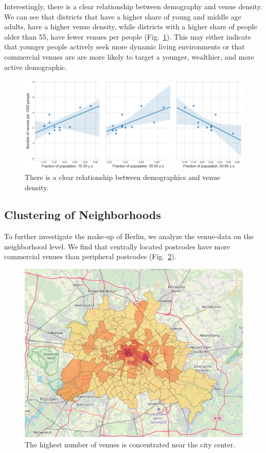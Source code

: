\documentclass[letter]{scrartcl}
\begin{document}
\clearpage 

Interestingly, there is a clear relationship between demography and venue density. We can see that districts that have a higher share of young and middle age adults, have a higher venue density, while  districts with a higher share of people older than 55, have fewer venues per people (Fig.~\ref{fig:PopVsVen}). This may either indicate that younger people actively seek more dynamic living environments or that commercial venues are are more likely to target a younger, wealthier, and more active demographic.

\begin{figure}[h!]
\centering
\includegraphics[width=12cm]{../Figures/PopVsVen.PNG}
\caption{There is a clear relationship between demographics and venue density.}\label{fig:PopVsVen}
\end{figure}

\subsection{Clustering of Neighborhoods}

To further investigate the make-up of Berlin, we analyze the venue-data on the neighborhood level. We find that centrally located postcodes have more commercial venues than peripheral postcodes (Fig.~\ref{fig:VenuesPLZ}). 
 
\begin{figure}[h!]
\centering
\includegraphics[width=12cm]{../Figures/VenuesMap.PNG}
\caption{The highest number of venues is concentrated near the city center.}\label{fig:VenuesPLZ}
\end{figure}
\end{document}
